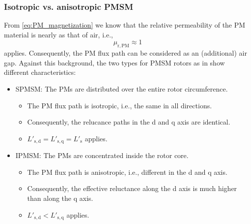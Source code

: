 \begin{frame}
	\frametitle{Isotropic vs. anisotropic PMSM}
	\onslide<+->
	From \eqref{eq:PM_magnetization} we know that the relative permeability of the PM material is nearly as that of air, i.e., $$\mu_\mathrm{r,PM} \approx 1$$ applies. \onslide<+-> Consequently, the PM flux path can be considered as an (additional) air gap. Against this background, the two types for PMSM rotors as in  show different characteristics:
	\vspace{0.5em}
	\begin{itemize}
		\item<+-> SPMSM: The PMs are distributed over the entire rotor circumference. 
		\begin{itemize}
			\item<+-> The PM flux path is isotropic, i.e., the same in all directions.
			\item<+-> Consequently, the relucance paths in the d and q axis are identical.
			\item<+-> $L'_\mathrm{s,d} =  L'_\mathrm{s,q} =L'_\mathrm{s}$ applies.
		\end{itemize}
		\vspace{0.5em}
		\item<+-> IPMSM: The PMs are concentrated inside the rotor core.
		\begin{itemize}
			\item<+-> The PM flux path is anisotropic, i.e., different in the d and q axis.
			\item<+-> Consequently, the effective reluctance along the d axis is much higher than along the q axis.
			\item<+-> $L'_\mathrm{s,d} <  L'_\mathrm{s,q}$ applies.
		\end{itemize}
	\end{itemize}
\end{frame}

